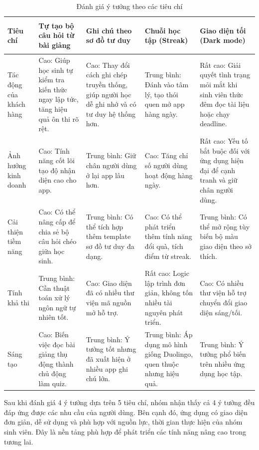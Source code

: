 \documentclass[12pt,a4paper]{report}
\begin{document}
\begin{table}[H]
\centering
\caption{Đánh giá ý tưởng theo các tiêu chí}\label{tab:idea-evaluation}
\small
\setlength{\tabcolsep}{3.5pt}
\begin{tabularx}{\textwidth}{>{\bfseries\raggedright\arraybackslash}p{2.4cm}YYYY}
\toprule
\textbf{Tiêu chí} & \textbf{Tự tạo bộ câu hỏi từ bài giảng} & \textbf{Ghi chú theo sơ đồ tư duy} & \textbf{Chuỗi học tập (Streak)} & \textbf{Giao diện tối (Dark mode)} \\
\midrule
Tác động của khách hàng & Cao: Giúp học sinh tự kiểm tra kiến thức ngay lập tức, tăng hiệu quả ôn thi rõ rệt. & Cao: Thay đổi cách ghi chép truyền thống, giúp người học dễ ghi nhớ và có tư duy hệ thống hơn. & Trung bình: Đánh vào tâm lý, tạo thói quen mở app hàng ngày. & Rất cao: Giải quyết tình trạng mỏi mắt khi sinh viên thức đêm đọc tài liệu hoặc chạy deadline. \\
Ảnh hưởng kinh doanh & Cao: Tính năng cốt lõi tạo độ nhận diện cao cho app. & Trung bình: Giữ chân người dùng ở lại app lâu hơn. & Cao: Tăng chỉ số người dùng hoạt động hàng ngày. & Rất cao: Yếu tố bắt buộc đối với ứng dụng hiện đại để cạnh tranh và giữ chân người dùng. \\
Cải thiện tiềm năng & Cao: Có thể nâng cấp để chia sẻ bộ câu hỏi chéo giữa học sinh. & Trung bình: Có thể tích hợp thêm template sơ đồ tư duy đa dạng. & Cao: Có thể phát triển thêm tính năng đổi quà, tích điểm từ streak. & Trung bình: Có thể mở rộng tùy biến bộ màu giao diện theo sở thích. \\
Tính khả thi & Trung bình: Cần thuật toán xử lý ngôn ngữ tự nhiên tốt. & Cao: Giao diện đã có nhiều thư viện mã nguồn mở hỗ trợ. & Rất cao: Logic lập trình đơn giản, không tốn nhiều tài nguyên phát triển. & Cao: Có nhiều thư viện hỗ trợ chuyển đổi giao diện sáng/tối. \\
Sáng tạo & Cao: Biến việc đọc bài giảng thụ động thành chủ động làm quiz. & Trung bình: Ý tưởng tốt nhưng đã xuất hiện ở nhiều app ghi chú lớn. & Trung bình: Áp dụng mô hình giống Duolingo, quen thuộc nhưng hiệu quả. & Trung bình: Ý tưởng phổ biến trên nhiều ứng dụng học tập. \\
\bottomrule
\end{tabularx}
\end{table}

Sau khi đánh giá 4 ý tưởng dựa trên 5 tiêu chí, nhóm nhận thấy cả 4 ý tưởng đều đáp ứng được các nhu cầu của người dùng. Bên cạnh đó, ứng dụng có giao diện đơn giản, dễ sử dụng và phù hợp với nguồn lực, thời gian thực hiện của nhóm sinh viên. Đây là nền tảng phù hợp để phát triển các tính năng nâng cao trong tương lai.
\end{document}
